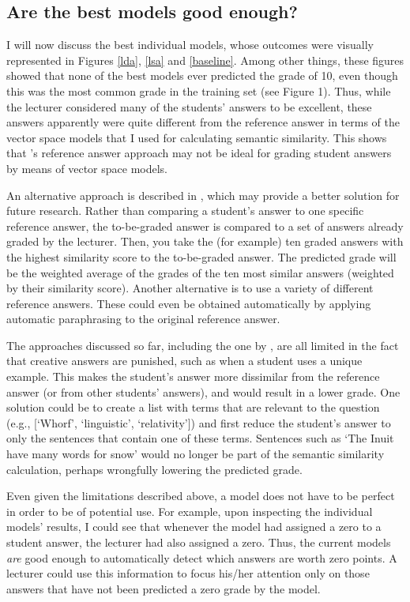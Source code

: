 \documentclass[a4paper,10pt,twoside]{article}
\begin{document}
\subsection{Are the best models good enough?}
I will now discuss the best individual models, whose outcomes were visually represented in Figures \ref{lda}, \ref{lsa} and \ref{baseline}. Among other things, these figures showed that none of the best models ever predicted the grade of 10, even though this was the most common grade in the training set (see Figure 1). Thus, while the lecturer considered many of the students' answers to be excellent, these answers apparently were quite different from the reference answer in terms of the vector space models that I used for calculating semantic similarity. This shows that 's reference answer approach may not be ideal for grading student answers by means of vector space models.

An alternative approach is described in , which may provide a better solution for future research. Rather than comparing a student's answer to one specific reference answer, the to-be-graded answer is compared to a set of answers already graded by the lecturer. Then, you take the (for example) ten graded answers with the highest similarity score to the to-be-graded answer. The predicted grade will be the weighted average of the grades of the ten most similar answers (weighted by their similarity score). Another alternative is to use a variety of different reference answers. These could even be obtained automatically by applying automatic paraphrasing to the original reference answer.

The approaches discussed so far, including the one by , are all limited in the fact that creative answers are punished, such as when a student uses a unique example. This makes the student's answer more dissimilar from the reference answer (or from other students' answers), and would result in a lower grade. One solution could be to create a list with terms that are relevant to the question (e.g., [`Whorf', `linguistic', `relativity']) and first reduce the student's answer to only the sentences that contain one of these terms. Sentences such as `The Inuit have many words for snow' would no longer be part of the semantic similarity calculation, perhaps wrongfully lowering the predicted grade.

Even given the limitations described above, a model does not have to be perfect in order to be of potential use. For example, upon inspecting the individual models' results, I could see that whenever the model had assigned a zero to a student answer, the lecturer had also assigned a zero. Thus, the current models \textit{are} good enough to automatically detect which answers are worth zero points. A lecturer could use this information to focus his/her attention only on those answers that have not been predicted a zero grade by the model.
\end{document}
